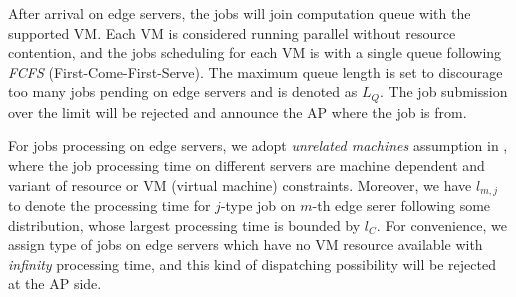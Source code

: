 After arrival on edge servers, the jobs will join computation queue with the supported VM.
Each VM is considered running parallel without resource contention, and the jobs scheduling for each VM is with a single queue following \emph{FCFS} (First-Come-First-Serve).
{\color{red}The maximum queue length is set to discourage too many jobs pending on edge servers and is denoted as $L_Q$. The job submission over the limit will be rejected and announce the AP where the job is from.}

{\color{red}For jobs processing on edge servers, we adopt \emph{unrelated machines} assumption in \cite{tan-online}, where the job processing time on different servers are machine dependent and variant of resource or VM (virtual machine) constraints.
Moreover, we have $l_{m,j}$ to denote the processing time for $j$-type job on $m$-th edge serer following some distribution, whose largest processing time is bounded by $l_C$.}
For convenience, we assign type of jobs on edge servers which have no VM resource available with \emph{infinity} processing time, and this kind of dispatching possibility will be rejected at the AP side.

